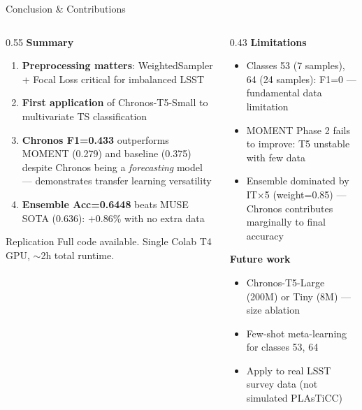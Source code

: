 \documentclass[aspectratio=169, 10pt]{beamer}
\begin{document}
\begin{frame}{Conclusion \& Contributions}
  \begin{columns}
    \begin{column}{0.55\textwidth}
      \textbf{Summary}
      \begin{enumerate}
        \item \textbf{Preprocessing matters}: WeightedSampler + Focal Loss critical for imbalanced LSST
        \item \textbf{First application} of Chronos-T5-Small to multivariate TS classification
        \item \textbf{Chronos F1=0.433} outperforms MOMENT (0.279) and baseline (0.375)
          despite Chronos being a \emph{forecasting} model — demonstrates transfer learning versatility
        \item \textbf{Ensemble Acc=0.6448} beats MUSE SOTA (0.636):
              $+$0.86\% with no extra data
      \end{enumerate}
      \vspace{0.4em}
      \begin{block}{Replication}
        Full code available. Single Colab T4 GPU, $\sim$2h total runtime.
      \end{block}
    \end{column}
    \begin{column}{0.43\textwidth}
      \textbf{Limitations}
      \begin{itemize}
        \item Classes 53 (7 samples), 64 (24 samples): F1=0 — fundamental data limitation
        \item MOMENT Phase 2 fails to improve: T5 unstable with few data
        \item Ensemble dominated by IT$\times$5 (weight=0.85) — Chronos contributes marginally to final accuracy
      \end{itemize}
      \vspace{0.4em}
      \textbf{Future work}
      \begin{itemize}
        \item Chronos-T5-Large (200M) or Tiny (8M) — size ablation
        \item Few-shot meta-learning for classes 53, 64
        \item Apply to real LSST survey data (not simulated PLAsTiCC)
      \end{itemize}
    \end{column}
  \end{columns}
\end{frame}
\end{document}
